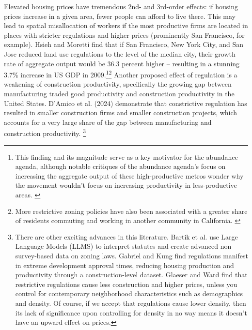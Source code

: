 \documentclass{article}[11pt]
\begin{document}
Elevated housing prices have tremendous 2nd- and 3rd-order effects: if housing prices increase in a given area, fewer people can afford to live there. This may lead to spatial misallocation of workers if the most productive firms are located in places with stricter regulations and higher prices (prominently San Francisco, for example). Hsieh and Moretti find that if San Francisco, New York City, and San Jose reduced land use regulations to the level of the median city, their growth rate of aggregate output would be 36.3 percent higher -- resulting in a stunning 3.7\% increase in US GDP in 2009.\footnote{This finding and its magnitude serve as a key motivator for the abundance agenda, although notable critiques of the abundance agenda's focus on increasing the aggregate output of these high-productive metros wonder why the movement wouldn't focus on increasing productivity in less-productive areas. \citep{abundanceambiguity}}\footnote{More restrictive zoning policies have also been associated with a greater share of residents commuting and working in another community in California. \citep{durst2021land}}  \citep{hsieh2019housing} Another proposed effect of regulation is a weakening of construction productivity, specifically the growing gap between manufacturing traded good productivity and construction productivity in the United States. D'Amico et al. (2024) demonstrate that constrictive regulation has resulted in smaller construction firms and smaller construction projects, which accounts for a very large share of the gap between manufacturing and construction productivity. \citep{d2024has} \footnote{There are other exciting advances in this literature. Bartik et al. use Large Language Models (LLMS) to interpret statutes and create advanced non-survey-based data on zoning laws. \citep{bartik2024costs} Gabriel and Kung find regulations manifest in extreme development approval times, reducing housing production and productivity through a construction-level dataset. \citep{gabriel2024development} Glaeser and Ward find that restrictive regulations cause less construction and higher prices, unless you control for contemporary neighborhood characteristics such as demographics and density. \citep{glaeser2009causes} Of course, if we accept that regulations cause lower density, then its lack of significance upon controlling for density in no way means it doesn't have an upward effect on prices.} 
\end{document}
